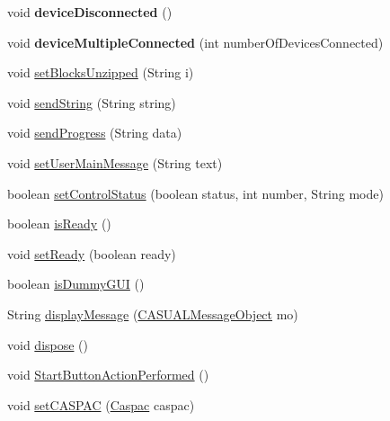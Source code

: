 \begin{DoxyCompactItemize}
\item 
\hypertarget{class_g_u_i_1_1testing_1_1automatic_af4e4b224ac56afffc095334549ecf69b}{void {\bfseries device\-Disconnected} ()}\label{class_g_u_i_1_1testing_1_1automatic_af4e4b224ac56afffc095334549ecf69b}

\item 
\hypertarget{class_g_u_i_1_1testing_1_1automatic_ad43d0bfc3c110b516d22e83c73fc0b23}{void {\bfseries device\-Multiple\-Connected} (int number\-Of\-Devices\-Connected)}\label{class_g_u_i_1_1testing_1_1automatic_ad43d0bfc3c110b516d22e83c73fc0b23}

\item 
void \hyperlink{class_g_u_i_1_1testing_1_1automatic_a7ac4d80d45919851bf85627853f40d63}{set\-Blocks\-Unzipped} (String i)
\item 
void \hyperlink{class_g_u_i_1_1testing_1_1automatic_a6e24fe81294766ade957d66f901382be}{send\-String} (String string)
\item 
void \hyperlink{class_g_u_i_1_1testing_1_1automatic_a988b6ddbf4c024470f436078a0191970}{send\-Progress} (String data)
\item 
void \hyperlink{class_g_u_i_1_1testing_1_1automatic_a400f90a87ae91a2df2108c91d847b470}{set\-User\-Main\-Message} (String text)
\item 
boolean \hyperlink{class_g_u_i_1_1testing_1_1automatic_a8dd9a5bf38eec0e10e5b70a4987fa580}{set\-Control\-Status} (boolean status, int number, String mode)
\item 
boolean \hyperlink{class_g_u_i_1_1testing_1_1automatic_a41748074b34eaf3ff1ddbb26c1bb2a11}{is\-Ready} ()
\item 
void \hyperlink{class_g_u_i_1_1testing_1_1automatic_a8220235441649228563095be44a50df1}{set\-Ready} (boolean ready)
\item 
boolean \hyperlink{class_g_u_i_1_1testing_1_1automatic_a689ead94a0fad075c1603493ce5f9a6c}{is\-Dummy\-G\-U\-I} ()
\item 
String \hyperlink{class_g_u_i_1_1testing_1_1automatic_a16f4a2dba0f1489a32e9c9b44036ddfd}{display\-Message} (\hyperlink{class_c_a_s_u_a_l_1_1_c_a_s_u_a_l_message_object}{C\-A\-S\-U\-A\-L\-Message\-Object} mo)
\item 
void \hyperlink{class_g_u_i_1_1testing_1_1automatic_ac3b48ee2fcb52574b33672869181a490}{dispose} ()
\item 
void \hyperlink{class_g_u_i_1_1testing_1_1automatic_a0f58e60a5432386ad0b1f8e26f64caf8}{Start\-Button\-Action\-Performed} ()
\item 
void \hyperlink{class_g_u_i_1_1testing_1_1automatic_a3a63f1f27a7070c4031eeb75049ab728}{set\-C\-A\-S\-P\-A\-C} (\hyperlink{class_c_a_s_u_a_l_1_1caspac_1_1_caspac}{Caspac} caspac)

\end{DoxyCompactItemize}
